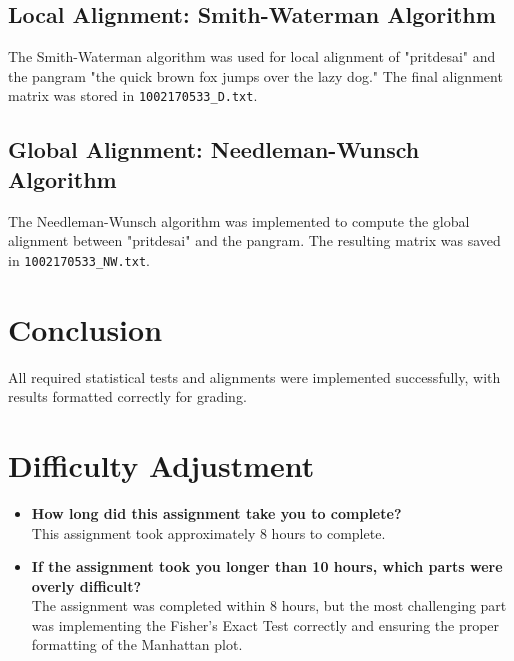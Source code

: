 \documentclass{article}
\begin{document}
\subsection{Local Alignment: Smith-Waterman Algorithm}
The Smith-Waterman algorithm was used for local alignment of "pritdesai" and the pangram "the quick brown fox jumps over the lazy dog." The final alignment matrix was stored in \texttt{1002170533\_D.txt}.

\subsection{Global Alignment: Needleman-Wunsch Algorithm}
The Needleman-Wunsch algorithm was implemented to compute the global alignment between "pritdesai" and the pangram. The resulting matrix was saved in \texttt{1002170533\_NW.txt}.

\section{Conclusion}
All required statistical tests and alignments were implemented successfully, with results formatted correctly for grading.

\section{Difficulty Adjustment}
\begin{itemize}
    \item \textbf{How long did this assignment take you to complete?} \\ 
    This assignment took approximately 8 hours to complete.
    \item \textbf{If the assignment took you longer than 10 hours, which parts were overly difficult?} \\ 
    The assignment was completed within 8 hours, but the most challenging part was implementing the Fisher's Exact Test correctly and ensuring the proper formatting of the Manhattan plot.
\end{itemize}
\end{document}
